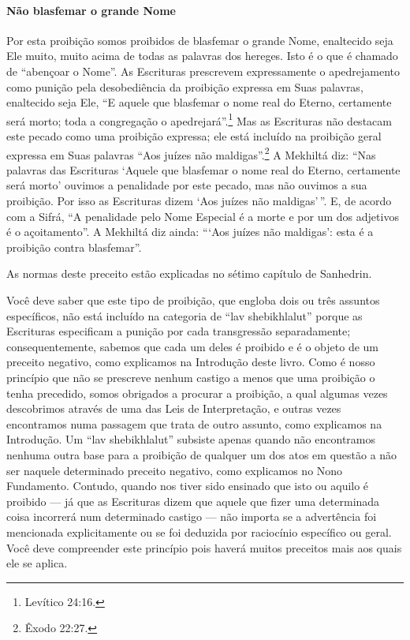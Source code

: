 \paragraph{Não blasfemar o grande Nome}

Por esta proibição somos proibidos de blasfemar o grande Nome,
enaltecido seja Ele muito, muito acima de todas as palavras dos hereges.
Isto é o que é chamado de ``abençoar o Nome''. As Escrituras prescrevem
expressamente o apedrejamento como punição pela desobediência da
proibição expressa em Suas palavras, enaltecido seja Ele, ``E aquele que
blasfemar o nome real do Eterno, certamente será morto; toda a
congregação o apedrejará''.\footnote{Levítico 24:16.} Mas as Escrituras não
destacam este pecado como uma proibição expressa; ele está incluído na proibição geral expressa em Suas palavras
``Aos juízes não maldigas''.\footnote{Êxodo 22:27.} A Mekhiltá diz: ``Nas
palavras das Escrituras `Aquele que blasfemar o nome real do Eterno,
certamente será morto' ouvimos a penalidade por este pecado, mas não
ouvimos a sua proibição. Por isso as Escrituras dizem `Aos juízes não
maldigas'\,''. E, de acordo com a Sifrá, ``A penalidade pelo Nome Especial
é a morte e por um dos adjetivos é o açoitamento''. A Mekhiltá diz
ainda: ```Aos juízes não maldigas': esta é a proibição contra
blasfemar''.

As normas deste preceito estão explicadas no sétimo capítulo de Sanhedrin.

Você deve saber que este tipo de proibição, que engloba dois ou três
assuntos específicos, não está incluído na categoria de ``lav
shebikhlalut'' porque as Escrituras especificam a punição por cada
transgressão separadamente; consequentemente, sabemos que cada um deles
é proibido e é o objeto de um preceito negativo, como explicamos na
Introdução deste livro. Como é nosso princípio que não se prescreve
nenhum castigo a menos que uma proibição o tenha precedido, somos
obrigados a procurar a proibição, a qual algumas vezes descobrimos
através de uma das Leis de Interpretação, e outras vezes encontramos
numa passagem que trata de outro assunto, como explicamos na
Introdução. Um ``lav shebikhlalut'' subsiste apenas quando não
encontramos nenhuma outra base para a proibição de qualquer um dos atos
em questão a não ser naquele determinado preceito negativo, como
explicamos no Nono Fundamento. Contudo, quando nos tiver sido ensinado
que isto ou aquilo é proibido --- já que as Escrituras dizem que aquele
que fizer uma determinada coisa incorrerá num determinado castigo ---
não importa se a advertência foi mencionada explicitamente ou se foi
deduzida por raciocínio específico ou geral. Você deve compreender este
princípio pois haverá muitos preceitos mais aos quais ele se aplica.

